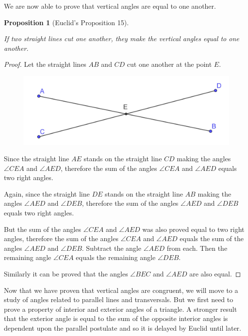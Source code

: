 \documentclass[
]{book}
\newtheorem{proposition}{Proposition}[chapter]
\theoremstyle{definition}
\theoremstyle{definition}
\theoremstyle{definition}
\theoremstyle{definition}
\theoremstyle{remark}
\begin{document}
We are now able to prove that vertical angles are equal to one another.

\begin{proposition}[Euclid's Proposition 15]
\protect\hypertarget{prp:prop15}{}\label{prp:prop15}

If two straight lines cut one another, they make the vertical angles equal to one another.

\end{proposition}

\begin{proof}

Let the straight lines \(AB\) and \(CD\) cut one another at the point \(E\).

\begin{figure}

{\centering \includegraphics[width=0.5\linewidth]{images/Prop15} 

}

\end{figure}

Since the straight line \(AE\) stands on the straight line \(CD\) making the angles \(\angle CEA\) and \(\angle AED\), therefore the sum of the angles \(\angle CEA\) and \(\angle AED\) equals two right angles.

Again, since the straight line \(DE\) stands on the straight line \(AB\) making the angles \(\angle AED\) and \(\angle DEB\), therefore the sum of the angles \(\angle AED\) and \(\angle DEB\) equals two right angles.

But the sum of the angles \(\angle CEA\) and \(\angle AED\) was also proved equal to two right angles, therefore the sum of the angles \(\angle CEA\) and \(\angle AED\) equals the sum of the angles \(\angle AED\) and \(\angle DEB\). Subtract the angle \(\angle AED\) from each. Then the remaining angle \(\angle CEA\) equals the remaining angle \(\angle DEB\).

Similarly it can be proved that the angles \(\angle BEC\) and \(\angle AED\) are also equal.

\end{proof}

Now that we have proven that vertical angles are congruent, we will move to a study of angles related to parallel lines and transversals. But we first need to prove a property of interior and exterior angles of a triangle. A stronger result that the exterior angle is equal to the sum of the opposite interior angles is dependent upon the parallel postulate and so it is delayed by Euclid until later.
\end{document}
